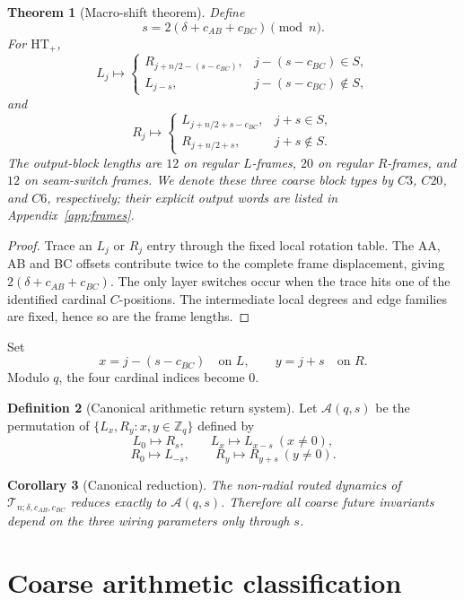 \documentclass[11pt,a4paper]{article}
\newtheorem{theorem}{Theorem}
\newtheorem{corollary}[theorem]{Corollary}
\theoremstyle{definition}
\newtheorem{definition}[theorem]{Definition}
\newcommand{\ZZ}{\mathbb Z}
\providecommand{\T}{}
\renewcommand{\T}{\mathcal T}
\providecommand{\A}{}
\renewcommand{\A}{\mathcal A}
\newcommand{\HTp}{\mathrm{HT}_{+}}
\begin{document}
\begin{theorem}[Macro-shift theorem]\label{thm:macro}
Define
\[
\boxed{s=2(\delta+c_{AB}+c_{BC})\pmod n.}
\]
For \(\HTp\),
\[
L_j\longmapsto
\begin{cases}
R_{j+n/2-(s-c_{BC})},&j-(s-c_{BC})\in S,\\
L_{j-s},&j-(s-c_{BC})\notin S,
\end{cases}
\]
and
\[
R_j\longmapsto
\begin{cases}
L_{j+n/2+s-c_{BC}},&j+s\in S,\\
R_{j+n/2+s},&j+s\notin S.
\end{cases}
\]
The output-block lengths are \(12\) on regular \(L\)-frames, \(20\) on regular \(R\)-frames, and \(12\) on seam-switch frames. We denote these three coarse block types by \(C3\), \(C20\), and \(C6\), respectively; their explicit output words are listed in Appendix~\ref{app:frames}.
\end{theorem}

\begin{proof}
Trace an \(L_j\) or \(R_j\) entry through the fixed local rotation table.
The AA, AB and BC offsets contribute twice to the complete frame displacement, giving \(2(\delta+c_{AB}+c_{BC})\).
The only layer switches occur when the trace hits one of the identified cardinal \(C\)-positions.
The intermediate local degrees and edge families are fixed, hence so are the frame lengths.
\end{proof}

Set
\[
x=j-(s-c_{BC})\quad\text{on }L,
\qquad
y=j+s\quad\text{on }R.
\]
Modulo \(q\), the four cardinal indices become \(0\).

\begin{definition}[Canonical arithmetic return system]
Let \(\A(q,s)\) be the permutation of
\(
\{L_x,R_y:x,y\in\ZZ_q\}
\)
defined by
\[
L_0\mapsto R_s,\qquad
L_x\mapsto L_{x-s}\ (x\ne0),
\]
\[
R_0\mapsto L_{-s},\qquad
R_y\mapsto R_{y+s}\ (y\ne0).
\]
\end{definition}

\begin{corollary}[Canonical reduction]\label{cor:Aqs}
The non-radial routed dynamics of
\(
\T_{n;\delta,c_{AB},c_{BC}}
\)
reduces exactly to \(\A(q,s)\).
Therefore all coarse future invariants depend on the three wiring parameters only through \(s\).
\end{corollary}

\section{Coarse arithmetic classification}\label{sec:coarse}
\end{document}

